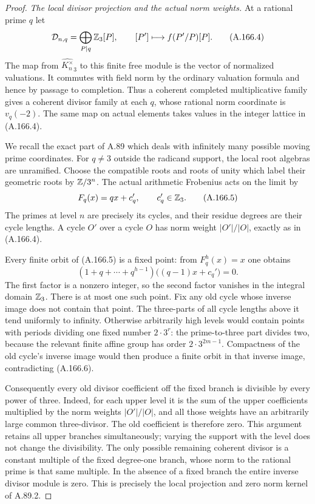 \begin{proof}
\emph{The local divisor projection and the actual norm weights.}
At a rational prime \(q\) let
\[
       \mathcal D_{n,q}=\bigoplus_{P\mid q}\mathbb Z_3[P],
       \qquad [P']\longmapsto f(P'/P)[P].
\tag{A.166.4}
\]
The map from \(\widehat{K_n^\times}_3\) to this finite free module
is the vector of normalized valuations.  It commutes with field norm
by the ordinary valuation formula and hence by passage to completion.
Thus a coherent completed multiplicative family gives a coherent
divisor family at each \(q\), whose rational norm coordinate is
\(v_q(-2)\).  The same map on actual elements takes values in
the integer lattice in (A.166.4).

We recall the exact part of A.89 which deals with infinitely many
possible moving prime coordinates.  For \(q\ne3\) outside the
radicand support, the local root algebras are unramified.  Choose the
compatible roots and roots of unity which label their geometric roots
by \(\mathbb Z/3^n\).  The actual arithmetic Frobenius acts on the limit by
\[
                         F_q(x)=qx+c_q',\qquad c_q'\in\mathbb Z_3.
\tag{A.166.5}
\]
The primes at level \(n\) are precisely its cycles, and their residue
degrees are their cycle lengths.  A cycle \(O'\) over a cycle \(O\)
has norm weight \(|O'|/|O|\), exactly as in (A.166.4).

Every finite orbit of (A.166.5) is a fixed point: from
\(F_q^h(x)=x\) one obtains
\[
           (1+q+\cdots+q^{h-1})\bigl((q-1)x+c_q'\bigr)=0.
\tag{A.166.6}
\]
The first factor is a nonzero integer, so the second factor vanishes
in the integral domain \(\mathbb Z_3\).  There is at most one such point.
Fix any old cycle whose inverse image does not contain that point.
The three-parts of all cycle lengths above it tend uniformly to
infinity.  Otherwise arbitrarily high levels would contain points
with periods dividing one fixed number \(2\cdot3^r\): the
prime-to-three part divides two, because the relevant finite affine
group has order \(2\cdot3^{2m-1}\).  Compactness of the old cycle's
inverse image would then produce a finite orbit in that inverse
image, contradicting (A.166.6).

Consequently every old divisor coefficient off the fixed branch is
divisible by every power of three.  Indeed, for each upper level it is
the sum of the upper coefficients multiplied by the norm weights
\(|O'|/|O|\), and all those weights have an arbitrarily large common
three-divisor.  The old coefficient is therefore zero.  This argument
retains all upper branches simultaneously; varying the support with
the level does not change the divisibility.  The only possible
remaining coherent divisor is a constant multiple of the fixed
degree-one branch, whose norm to the rational prime is that same
multiple.  In the absence of a fixed branch the entire inverse
divisor module is zero.  This is precisely the local projection and
zero norm kernel of A.89.2.


\end{proof}
